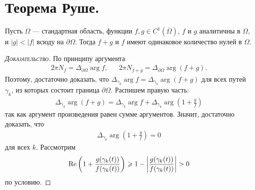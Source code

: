 \documentclass[../complex-analysis.tex]{subfiles}
\begin{document}
\newpage
\section{Теорема Руше.}

\begin{thm}[Руше]
 Пусть $ \Omega $ --- стандартная область, функции $ f,g \in C^{1}(\overline\Omega) $, $ f $ и $ g $ аналитичны в $ \Omega $, и $ \left| g \right| < \left| f \right| $ всюду на $ \partial \Omega $. Тогда $ f + g $ и $ f $ имеют одинаковое количество нулей в $ \Omega $.
\end{thm}
\begin{proof}[\normalfont\textsc{Доказательство}]
 По принципу аргумента
 \begin{align*} 2\pi N_f = \Delta_{\partial\Omega} \arg f, && 2\pi N_{f+g} = \Delta_{\partial\Omega}\arg(f+g).
 \end{align*} Поэтому, достаточно доказать, что $ \Delta_{\gamma_k} \arg f = \Delta_{\gamma_k} \arg (f+g) $ для всех путей $ \gamma_k $, из которых состоит граница $ \partial\Omega $. Распишем правую часть:
 \begin{align*}
  \Delta_{\gamma_k} \arg (f+g)  = \Delta_{\gamma_k} \arg f + \Delta_{\gamma_k} \arg \left( 1 + \frac{g}{f}\right)
 \end{align*} так как аргумент произведения равен сумме аргументов. Значит, достаточно доказать, что
 \begin{align*}
  \Delta_{\gamma_k} \arg \left( 1 + \frac{g}{f} \right) = 0
 \end{align*} для всех $ k $. Рассмотрим 
 \begin{align*}
  \operatorname{Re} \left(1 + \frac{g(\gamma_k(t))}{f(\gamma_k(t))}\right) \geqslant 1 - \left| \frac{g(\gamma_k(t))}{f(\gamma_k(t))} \right| > 0
 \end{align*} по условию. 


\end{proof}
\end{document}
